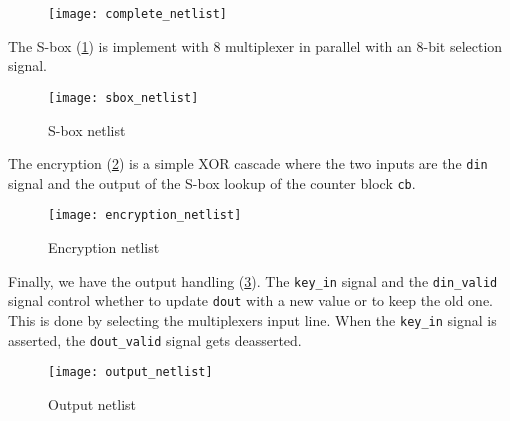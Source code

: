 \clearpage
{}
\begin{figure}
    \thispagestyle{empty}
    \centering
    \hspace*{-9cm}
    \texttt{[image: complete\_netlist]}
\end{figure}
\restoregeometry
\clearpage

The S-box (\cref{fig:sbox_netlist}) is implement with 8 multiplexer in parallel with an 8-bit selection signal.
\begin{figure}[!ht]
    \centering
    \texttt{[image: sbox\_netlist]}
    \caption{S-box netlist}
    \label{fig:sbox_netlist}
\end{figure}

The encryption (\cref{fig:encryption_netlist}) is a simple XOR cascade where the two inputs are the \lstinline{din} signal and the output of the S-box lookup of the counter block \lstinline{cb}.
\begin{figure}
    \centering
    \texttt{[image: encryption\_netlist]}
    \caption{Encryption netlist}
    \label{fig:encryption_netlist}
\end{figure}

Finally, we have the output handling (\cref{fig:output_netlist}). The \lstinline{key_in} signal and the \lstinline{din_valid} signal control whether to update \lstinline{dout} with a new value or to keep the old one. This is done by selecting the multiplexers input line. When the \lstinline{key_in} signal is asserted, the \lstinline{dout_valid} signal gets deasserted.
\begin{figure}
    \centering
    \texttt{[image: output\_netlist]}
    \caption{Output netlist}
    \label{fig:output_netlist}
\end{figure}